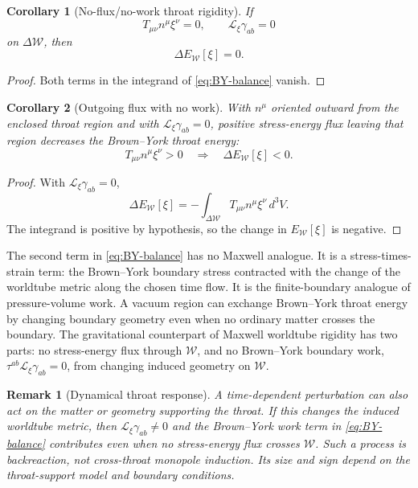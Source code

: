 \documentclass[aps,prd,10pt,onecolumn,nofootinbib,superscriptaddress,floatfix]{revtex4-2}
\newtheorem{corollary}{Corollary}
\newtheorem{remark}{Remark}
\begin{document}
\begin{corollary}[No-flux/no-work throat rigidity]
\label{cor:zero-flux}
If
\begin{equation}
  T_{\mu\nu}n^\mu\xi^\nu=0,
  \qquad
  \mathcal L_\xi\gamma_{ab}=0
\end{equation}
on $\Delta\mathcal W$, then
\begin{equation}
  \Delta E_{\mathcal W}[\xi]=0.
\end{equation}
\end{corollary}

\begin{proof}
Both terms in the integrand of \eqref{eq:BY-balance} vanish.
\end{proof}

\begin{corollary}[Outgoing flux with no work]
\label{cor:outgoing-flux}
With $n^\mu$ oriented outward from the enclosed throat region and with
$\mathcal L_\xi\gamma_{ab}=0$, positive stress-energy flux leaving that region
decreases the Brown--York throat energy:
\begin{equation}
  T_{\mu\nu}n^\mu\xi^\nu>0
  \quad\Longrightarrow\quad
  \Delta E_{\mathcal W}[\xi]<0 .
\end{equation}
\end{corollary}

\begin{proof}
With $\mathcal L_\xi\gamma_{ab}=0$,
\begin{equation}
  \Delta E_{\mathcal W}[\xi]
  =
  -\int_{\Delta\mathcal W}T_{\mu\nu}n^\mu\xi^\nu\,d^3V .
\end{equation}
The integrand is positive by hypothesis, so the change in
$E_{\mathcal W}[\xi]$ is negative.
\end{proof}

The second term in \eqref{eq:BY-balance} has no Maxwell analogue.  It is a
stress-times-strain term: the Brown--York boundary
stress contracted with the change of the worldtube metric along the chosen time
flow.  It is the finite-boundary analogue of pressure-volume work.  A vacuum
region can exchange Brown--York throat energy by changing boundary geometry
even when no ordinary matter crosses the boundary.  The gravitational
counterpart of Maxwell worldtube rigidity has two parts: no stress-energy flux
through $\mathcal W$, and no Brown--York boundary work,
$\tau^{ab}\mathcal L_\xi\gamma_{ab}=0$, from changing induced geometry on
$\mathcal W$.

\begin{remark}[Dynamical throat response]
\label{rem:dynamical-throat-response}
A time-dependent perturbation can also act on the matter or geometry supporting
the throat.  If this changes the induced worldtube metric, then
$\mathcal L_\xi\gamma_{ab}\ne0$ and the Brown--York work term in
\eqref{eq:BY-balance} contributes even when no stress-energy flux crosses
$\mathcal W$.  Such a process is backreaction, not cross-throat monopole
induction.  Its size and sign depend on the
throat-support model and boundary conditions.
\end{remark}
\end{document}
